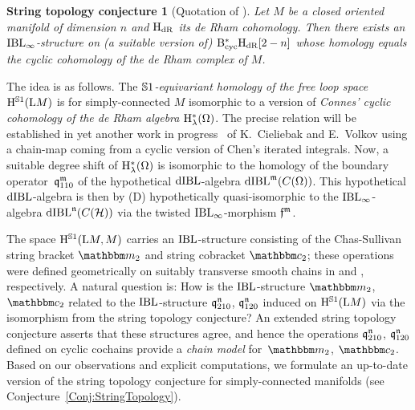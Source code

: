 \documentclass[\MainFolder/Text.tex]{subfiles}
\begin{document}
\newtheorem*{Conject}{String topology conjecture}
\begin{Conject}[{Quotation of \cite[Conjecture~1.12]{Cieliebak2015}}]
Let $M$ be a closed oriented manifold of dimension $n$ and $\mathrm{H}_{\mathrm{dR}}$ its de Rham cohomology. Then there exists an $\mathrm{IBL}_\infty$-structure on (a suitable version of) $\mathrm{B}_{\mathrm{cyc}}^* \mathrm{H}_{\mathrm{dR}}[2-n]$ whose homology equals the cyclic cohomology of the de Rham complex of $M$.
\end{Conject}

The idea is as follows. The \emph{$\mathbb{S}{1}$-equivariant homology of the free loop space} $\mathrm{H}^{\mathbb{S}{1}}(\mathrm{L} M)$ is for simply-connected $M$ isomorphic to a version of \emph{Connes' cyclic cohomology of the de Rham algebra} $\mathrm{H}_{\lambda}^*(\Omega)$. The precise relation will be established in yet another work in progress~\cite{Cieliebak2018} of K.~Cieliebak and E.~Volkov using a chain-map coming from a cyclic version of Chen's iterated integrals. Now, a suitable degree shift of $\mathrm{H}_{\lambda}^*(\Omega)$ is isomorphic to the homology of the boundary operator~$\mathfrak{q}_{110}^{\mathfrak{m}}$ of the hypothetical $\mathrm{dIBL}$-algebra $\mathrm{dIBL}^{\mathfrak{m}}(C(\Omega))$. This hypothetical $\mathrm{dIBL}$-algebra is then by (D) hypothetically quasi-isomorphic to the $\mathrm{IBL}_\infty$-algebra $\mathrm{dIBL}^{\mathfrak{n}}(C(\mathcal{H}))$ via the twisted $\mathrm{IBL}_\infty$-morphism $\mathfrak{f}^{\mathfrak{m}}$.

The space $\mathrm{H}^{\mathbb{S}{1}}(\mathrm{L} M, M)$ carries an $\mathrm{IBL}$-structure consisting of the Chas-Sullivan string bracket $\StringOp_2$ and string cobracket $\StringCoOp_2$;  these operations were defined geometrically on suitably transverse smooth chains in \cite{Sullivan1999} and \cite{Sullivan2002}, respectively. A natural question is: How is the $\mathrm{IBL}$-structure $\StringOp_2$, $\StringCoOp_2$ related to the $\mathrm{IBL}$-structure $\mathfrak{q}_{210}^{\mathfrak{n}}$, $\mathfrak{q}_{120}^{\mathfrak{n}}$ induced on $\mathrm{H}^{\mathbb{S}{1}}(\mathrm{L} M)$ via the isomorphism from the string topology conjecture? An extended string topology conjecture asserts that these structures agree, and hence the operations $\mathfrak{q}_{210}^{\mathfrak{n}}$, $\mathfrak{q}_{120}^{\mathfrak{n}}$ defined on cyclic cochains provide a \emph{chain model} for~$\StringOp_2$, $\StringCoOp_2$. Based on our observations and explicit computations, we formulate an up-to-date version of the string topology conjecture for simply-connected manifolds (see Conjecture~\ref{Conj:StringTopology}).
\end{document}
